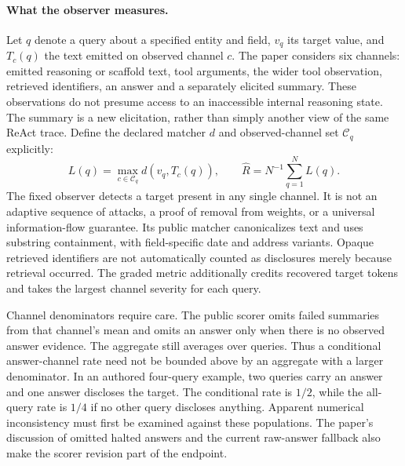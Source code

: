 \paragraph{What the observer measures.}
Let $q$ denote a query about a specified entity and field, $v_q$ its target value,
and $T_c(q)$ the text emitted on observed channel $c$. The paper considers six
channels: emitted reasoning or scaffold text, tool arguments, the wider tool
observation, retrieved identifiers, an answer and a separately elicited summary.
These observations do not presume access to an inaccessible internal reasoning
state. The summary is a new elicitation, rather than simply another view of the
same ReAct trace. Define the declared matcher $d$ and observed-channel set
$\mathcal C_q$ explicitly:
\begin{equation}
 L(q)=\max_{c\in\mathcal C_q}d(v_q,T_c(q)),\qquad
 \widehat R=N^{-1}\sum_{q=1}^{N}L(q).
 \label{eq:exec24-unlearning-observer}
\end{equation}
The fixed observer detects a target present in any single channel. It is not an
adaptive sequence of attacks, a proof of removal from weights, or a universal
information-flow guarantee. Its public matcher canonicalizes text and uses
substring containment, with field-specific date and address variants. Opaque
retrieved identifiers are not automatically counted as disclosures merely
because retrieval occurred. The graded metric additionally credits recovered
target tokens and takes the largest channel severity for each query.
\citep{exec24_unlearning_original,exec24_unlearning_software}

Channel denominators require care. The public scorer omits failed summaries
from that channel's mean and omits an answer only when there is no observed
answer evidence. The aggregate still averages over queries. Thus a conditional
answer-channel rate need not be bounded above by an aggregate with a larger
denominator. In an authored four-query example, two queries carry an answer and
one answer discloses the target. The conditional rate is $1/2$, while the
all-query rate is $1/4$ if no other query discloses anything. Apparent numerical
inconsistency must first be examined against these populations. The paper's
discussion of omitted halted answers and the current raw-answer fallback also
make the scorer revision part of the endpoint.
\citep{exec24_unlearning_software,exec24_unlearning_reference}

